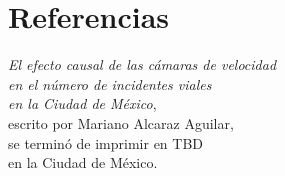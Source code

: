 \documentclass[11pt, oneside]{book}
\begin{document}


\chapter*{Referencias}



\clearpage
\thispagestyle{empty}
\vspace*{\fill}
\begin{center}
    \small
    \textit{El efecto causal de las cámaras de velocidad\\
    en el número de incidentes viales\\
    en la Ciudad de México},\\
    escrito por Mariano Alcaraz Aguilar,\\
    se terminó de imprimir en TBD\\
    en la Ciudad de México.
\end{center}
\vspace*{\fill}


\end{document}
